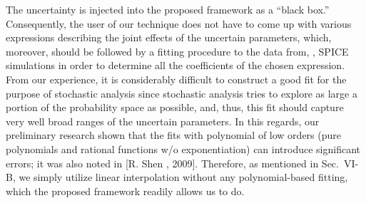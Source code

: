 \begin{authors}
The uncertainty is injected into the proposed framework as a ``black box.''
Consequently, the user of our technique does not have to come up with various expressions describing the joint effects of the uncertain parameters, which, moreover, should be followed by a fitting procedure to the data from, \eg, SPICE simulations in order to determine all the coefficients of the chosen expression.
From our experience, it is considerably difficult to construct a good fit for the purpose of stochastic analysis since stochastic analysis tries to explore as large a portion of the probability space as possible, and, thus, this fit should capture very well broad ranges of the uncertain parameters.
In this regards, our preliminary research shown that the fits with polynomial of low orders (pure polynomials and rational functions w/o exponentiation) can introduce significant errors; it was also noted in [R. Shen \etal, 2009].
Therefore, as mentioned in Sec.~VI-B, we simply utilize linear interpolation without any polynomial-based fitting, which the proposed framework readily allows us to do.
\end{authors}

